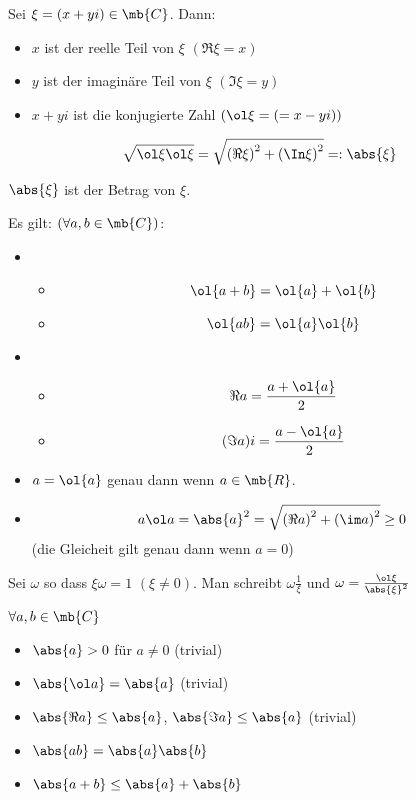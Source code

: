 \begin{Def}
  Sei $\xi=(x+yi)\in\mb{C}$. Dann:
  \begin{itemize}
    \item $x$ ist der reelle Teil von $\xi$ $(\Re\xi=x)$
    \item $y$ ist der imaginäre Teil von $\xi$ $(\Im\xi=y)$
    \item $x+yi$ ist die konjugierte Zahl $\left( \ol\xi=\left( =x-yi \right) \right)$
  \end{itemize}
\end{Def}
\begin{Bew}
  \[\sqrt{\ol\xi\ol\xi}=\sqrt{\left( \Re\xi \right)^2+\left( \In\xi \right)^2}=:\abs{\xi}\]
\end{Bew}
\begin{Def}
  $\abs{\xi}$ ist der Betrag von $\xi$.
\end{Def}
\begin{Sat}
  Es gilt: $(\forall a,b\in\mb{C})$:
  \begin{itemize}
    \item 
      \begin{itemize}
        \item \[\ol{a+b}=\ol{a}+\ol{b}\]
        \item \[\ol{ab}=\ol{a}\ol{b}\]
      \end{itemize}
    \item 
      \begin{itemize}
        \item \[\Re a =\frac{a+\ol{a}}{2}\]
        \item \[(\Im a) i=\frac{a-\ol{a}}{2}\]
      \end{itemize}
    \item $a=\ol{a}$ genau dann wenn $a\in\mb{R}$.
    \item \[a\ol a=\abs{a}^2=\sqrt{\left( \Re a \right)^2+\left( \im a \right)^2}\geq 0\]
      (die Gleicheit gilt genau dann wenn $a=0$)
  \end{itemize}
\end{Sat}
\begin{Bem}
  Sei $\omega$ so dass $\xi\omega=1$ $(\xi\neq 0)$. Man schreibt $\omega\frac{1}{\xi}$ und $\omega=\frac{\ol\xi}{\abs{\xi}^2}$
\end{Bem}
\begin{Sat}
  $\forall a,b\in\mb{C}$
  \begin{itemize}
    \item $\abs{a}>0$ für $a\neq 0$ (trivial)
    \item $\abs{\ol a}=\abs{a}$ (trivial)
    \item $\abs{\Re a}\leq\abs{a}$, $\abs{\Im a}\leq\abs{a}$ (trivial)
    \item $\abs{ab}=\abs{a}\abs{b}$
    \item $\abs{a+b}\leq\abs{a}+\abs{b}$
  \end{itemize}
\end{Sat}
